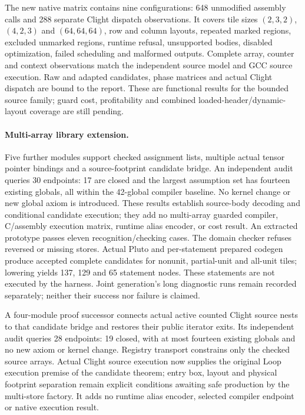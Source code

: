 The new native matrix contains nine configurations: 648 unmodified assembly
calls and 288 separate Clight dispatch observations. It covers tile sizes
$(2,3,2)$, $(4,2,3)$ and $(64,64,64)$, row and column layouts, repeated marked
regions, excluded unmarked regions, runtime refusal, unsupported bodies, disabled
optimization, failed scheduling and malformed outputs. Complete array, counter
and context observations match the independent source model and GCC source
execution. Raw and adapted candidates, phase matrices and actual Clight
dispatch are bound to the report. These are functional results for the bounded
source family; guard cost, profitability and combined loaded-header/dynamic-layout
coverage are still pending.

\paragraph{Multi-array library extension.}
Five further modules support checked assignment lists, multiple actual tensor
pointer bindings and a source-footprint candidate bridge. An independent audit
queries 30 endpoints: 17 are closed and the largest assumption set has fourteen
existing globals, all within the 42-global compiler baseline. No kernel change
or new global axiom is introduced. These results establish source-body decoding
and conditional candidate execution; they add no multi-array guarded compiler,
C/assembly execution matrix, runtime alias encoder, or cost result.
An extracted prototype passes eleven recognition/checking cases. The domain
checker refuses reversed or missing stores. Actual Pluto and per-statement
prepared codegen produce accepted complete candidates for nonunit, partial-unit
and all-unit tiles; lowering yields 137, 129 and 65 statement nodes. These
statements are not executed by the harness. Joint generation's long diagnostic
runs remain recorded separately; neither their success nor failure is claimed.

A four-module proof successor connects actual active counted Clight source
nests to that candidate bridge and restores their public iterator exits.
Its independent audit queries 28 endpoints: 19 closed, with at most fourteen
existing globals and no new axiom or kernel change. Registry transport
constrains only the checked source arrays. Actual Clight source execution
now supplies the original Loop execution premise of the candidate theorem; entry box,
layout and physical footprint separation remain explicit conditions awaiting
safe production by the multi-store factory. It adds no runtime alias encoder,
selected compiler endpoint or native execution result.

